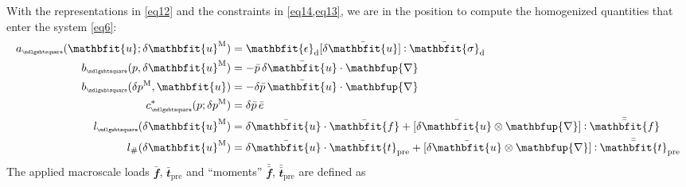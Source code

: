 \documentclass[12pt,a4paper]{article}
\renewcommand{\ta}[1]{\mathbfit{#1}}
\renewcommand{\ts}[1]{\mathbfit{#1}}
\renewcommand{\diff}{\mathbfup{\nabla}}
\renewcommand{\Box}{\mdlgwhtsquare}
\DeclarePairedDelimiter{\homgen}{\langle}{\rangle_\rve}
\newcommand{\prescribed}{\mathrm{pre}}
\renewcommand{\dev}{\mathrm{d}}
\newcommand{\rve}{
  {\mathchoice
   {\mbox{\scalebox{0.67}{$\Box$}}}
   {\mbox{\scalebox{0.67}{$\Box$}}}
   {\mbox{\scalebox{0.5}{$\Box$}}}
   {\mbox{\scalebox{0.375}{$\Box$}}}
  }
}
\begin{document}

With the representations in \cref{eq12} and the constraints in \cref{eq14,eq13}, we are in the position to compute the homogenized quantities that enter the system \cref{eq6}:
\begin{align}
    a_\rve(\ta{u};\delta\ta{u}^\macro) &=
    \ts{\epsilon}_\dev[\delta\bar{\ta{u}}] \dprod \bar{\ts{\sigma}}_\dev
\label{eq15a} \\
    b_\rve(p,\delta\ta{u}^\macro) &=
    - \bar{p}\,\delta\bar{\ta{u}}\cdot\diff
\label{eq15b} \\
    b_\rve(\delta p^\macro,\ta{u}) &=
    - \delta\bar{p}\,\bar{\ta{u}}\cdot\diff
\label{eq15c} \\
    c^*_\rve(p;\delta p^\macro) &=
    \delta\bar{p}\,\bar{e}
\label{eq15d} \\
    l_\rve(\delta\ta{u}^\macro) &=
    \delta\bar{\ta{u}}\cdot \bar{\ta f} + [\delta\bar{\ta{u}}\outerp\diff]\dprod \bar{\bar{\ta f}}
\label{eq15e} \\
    l_\#(\delta\ta{u}^\macro) &=
    \delta\bar{\ta{u}} \cdot \bar{\ta t}_\prescribed + [\delta\bar{\ta u}\outerp\diff]\dprod \bar{\bar{\ta{t}}}_\prescribed
\label{eq15f}
\end{align}
The applied macroscale loads $\bar{\ta f}$, $\bar{\ta t}_\prescribed$ and ``moments'' $\bar{\bar{\ta f}}$, $\bar{\bar{\ta t}}_\prescribed$ are defined as
\end{document}
